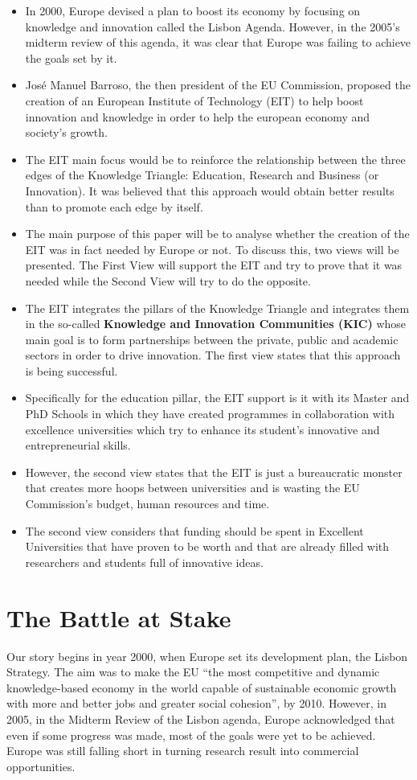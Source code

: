 \documentclass[11pt,a4paper,oneside,twocolumn]{IEEEtran}
\begin{document}
\begin{itemize}
    \item In 2000, Europe devised a plan to boost its economy by focusing on knowledge and innovation called the Lisbon Agenda. However, in the 2005’s midterm review of this agenda, it was clear that Europe was failing to achieve the goals set by it.
    \item José Manuel Barroso, the then president of the EU Commission, proposed the creation of an European Institute of Technology (EIT) to help boost innovation and knowledge in order to help the european economy and society’s growth.
    \item The EIT main focus would be to reinforce the relationship between the three edges of the Knowledge Triangle: Education, Research and Business (or Innovation). It was believed that this approach would obtain better results than to promote each edge by itself.
    \item The main purpose of this paper will be to analyse whether the creation of the EIT was in fact needed by Europe or not. To discuss this, two views will be presented. The First View will support the EIT and try to prove that it was needed while the Second View will try to do the opposite.
    \item The EIT integrates the pillars of the Knowledge Triangle and integrates them in the so-called \textbf{Knowledge and Innovation Communities (KIC)} whose main goal is to form partnerships between the private, public and academic sectors in order to drive innovation. The first view states that this approach is being successful.
    \item Specifically for the education pillar, the EIT support is it with its Master and PhD Schools in which they have created programmes in collaboration with excellence universities which try to enhance its student’s innovative and entrepreneurial skills.
    \item However, the second view states that the EIT is just a bureaucratic monster that creates more hoops between universities and is wasting the EU Commission’s budget, human resources and time.
    \item The second view considers that funding should be spent in Excellent Universities that have proven to be worth and that are already filled with researchers and students full of innovative ideas.
\end{itemize}

\section{The Battle at Stake}
Our story begins in year 2000, when Europe set its development plan, the Lisbon Strategy. The aim was to make the EU ``the most competitive and dynamic knowledge-based economy in the world capable of sustainable economic growth with more and better jobs and greater social cohesion''\cite{2_1}, by 2010. However, in 2005, in the Midterm Review of the Lisbon agenda, Europe acknowledged that even if some progress was made, most of the goals were yet to be achieved. Europe was still falling short in turning research result into commercial opportunities.
\end{document}
